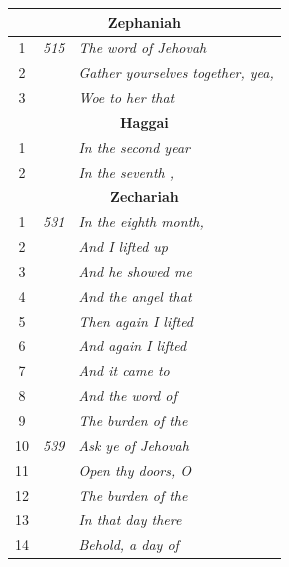 \documentclass{article}
\newlength{\minipageheight}
\begin{document}
\begin{flushright}
\begin{minipage}[r][\minipageheight][t]{3in}
\begin{longtable}{ccl}
            \multicolumn{3}{c}{\textbf{Zephaniah}}                                 \\
            \hline
            1           & \textit{515} & \textit{The word of Jehovah}              \\
            2           &              & \textit{Gather yourselves together, yea,} \\
            3           &              & \textit{Woe to her that}                  \\

            \multicolumn{3}{c}{\textbf{Haggai}}                                    \\
            \hline
            1           &              & \textit{In the second year}               \\
            2           &              & \textit{In the seventh ,}                 \\

            \multicolumn{3}{c}{\textbf{Zechariah}}                                 \\
            \hline
            1           & \textit{531} & \textit{In the eighth month,}             \\
            2           &              & \textit{And I lifted up}                  \\
            3           &              & \textit{And he showed me}                 \\
            4           &              & \textit{And the angel that}               \\
            5           &              & \textit{Then again I lifted}              \\
            6           &              & \textit{And again I lifted}               \\
            7           &              & \textit{And it came to}                   \\
            8           &              & \textit{And the word of}                  \\
            9           &              & \textit{The burden of the}                \\
            10          & \textit{539} & \textit{Ask ye of Jehovah}                \\
            11          &              & \textit{Open thy doors, O}                \\
            12          &              & \textit{The burden of the}                \\
            13          &              & \textit{In that day there}                \\
            14          &              & \textit{Behold, a day of}                 \\


\end{longtable}
\end{minipage}
\end{flushright}
\end{document}
